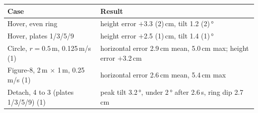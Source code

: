 \begin{tabularx}{\textwidth}{lX}
\toprule
Case & Result \\
\midrule
Hover, even ring & height error $+$3.3 (2)\,cm, tilt 1.2 (2)\,\si{\degree} \\
Hover, plates 1/3/5/9 & height error $+$2.5 (1)\,cm, tilt 1.4 (1)\,\si{\degree} \\
Circle, $r = 0.5$\,m, 0.125\,m/s (1) & horizontal error 2.9\,cm mean, 5.0\,cm max; height error $+$3.2\,cm \\
Figure-8, 2\,m $\times$ 1\,m, 0.25\,m/s (1) & horizontal error 2.6\,cm mean, 5.4\,cm max \\
Detach, 4 to 3 (plates 1/3/5/9) (1) & peak tilt 3.2\,\si{\degree}, under 2\,\si{\degree} after 2.6\,s, ring dip 2.7\,cm \\
\bottomrule
\end{tabularx}
